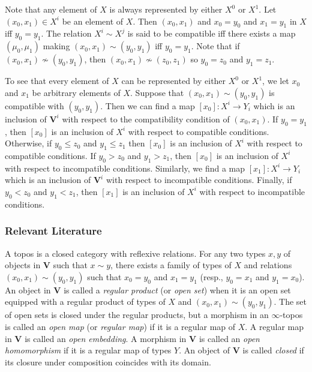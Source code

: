 \documentclass[a4paper,reqno,oneside]{article}
\begin{document}
Note that any element of $X$ is always represented by either $X^0$ or $X^1$. Let $(x_0,x_1)\in X^i$ be an element of $X$. Then $(x_0,x_1)$ and $x_0=y_0$ and $x_1=y_1$ in $X$ iff $y_0=y_1$. The relation $X^i\sim X^j$ is said to be compatible iff there exists a map $(\mu_0, \mu_1)$ making $(x_0,x_1)\sim (y_0,y_1)$ iff $y_0=y_1$. Note that if $(x_0,x_1)\not\sim (y_0,y_1)$, then $(x_0,x_1)\not\sim (z_0,z_1)$ so $y_0=z_0$ and $y_1=z_1$.

To see that every element of $X$ can be represented by either $X^0$ or $X^1$, we let $x_0$ and $x_1$ be arbitrary elements of $X$. Suppose that $(x_0,x_1)\sim (y_0,y_1)$ is compatible with $(y_0,y_1)$. Then we can find a map $[x_0]:X^{i}\to Y_i$ which is an inclusion of $\mathbf{V}^i$ with respect to the compatibility condition of $(x_0,x_1)$. If $y_0=y_1$, then $[x_0]$ is an inclusion of $X^{i}$ with respect to compatible conditions. Otherwise, if $y_0\leq z_0$ and $y_1\leq z_1$ then $[x_0]$ is an inclusion of $X^{i}$ with respect to compatible conditions. If $y_0>z_0$ and $y_1>z_1$, then $[x_0]$ is an inclusion of $X^{i}$ with respect to incompatible conditions. Similarly, we find a map $[x_1]:X^{i}\to Y_i$ which is an inclusion of $\mathbf{V}^i$ with respect to incompatible conditions. Finally, if $y_0<z_0$ and $y_1<z_1$, then $[x_1]$ is an inclusion of $X^{i}$ with respect to incompatible conditions. 


\subsubsection*{Relevant Literature}

A topos is a closed category with reflexive relations. For any two types $x,y$ of objects in $\mathbf{V}$ such that $x\sim y$, there exists a family of types of $X$ and relations $(x_0,x_1)\sim (y_0,y_1)$ such that $x_0=y_0$ and $x_1=y_1$ (resp., $y_0=x_1$ and $y_1=x_0$). An object in $\mathbf{V}$ is called a \textit{regular product} (or \textit{open set}) when it is an open set equipped with a regular product of types of $X$ and $(x_0,x_1)\sim (y_0,y_1)$. The set of open sets is closed under the regular products, but a morphism in an $\infty$-topos is called an \textit{open map} (or \textit{regular map}) if it is a regular map of $X$. A regular map in $\mathbf{V}$ is called an \textit{open embedding}. A morphism in $\mathbf{V}$ is called an \textit{open homomorphism} if it is a regular map of types $Y$. An object of $\mathbf{V}$ is called \textit{closed} if its closure under composition coincides with its domain.
\end{document}
